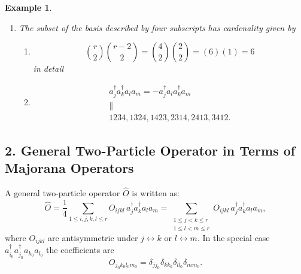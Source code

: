 \documentclass[aps,preprint]{revtex4}%
\newtheorem{example}[theorem]{Example}
\begin{document}
\begin{enumerate}
\begin{example}
\begin{enumerate}
\item The subset of the basis described by four subscripts has cardenality
given by

\begin{enumerate}
\item
\begin{equation}
\binom{r}{2}\binom{r-2}{2}=\binom{4}{2}\binom{2}{2}=\left(  6\right)  \left(
1\right)  =6
\end{equation}
in detail

\item
\begin{gather}
a_{j}^{\dagger}a_{k}^{\dagger}a_{l}a_{m}=-a_{j}^{\dagger}a_{l}a_{k}^{\dagger
}a_{m}\\
\parallel\\
1234,1324,1423,2314,2413,3412.
\end{gather}

\end{enumerate}
\end{enumerate}
\end{example}
\end{enumerate}

\subsection*{2. General Two-Particle Operator in Terms of Majorana Operators}

A general two-particle operator $\hat{O}$ is written as:
\[
\hat{O}=\frac{1}{4}\sum_{1\leq i,j,k,l\leq r}O_{ijkl}\,a_{j}^{\dagger}%
a_{k}^{\dagger}a_{l}a_{m}=\sum_{\substack{1\leq j<k\leq r\\1\leq l<m\leq
r}}O_{ijkl}\,a_{j}^{\dagger}a_{k}^{\dagger}a_{l}a_{m},
\]
where $O_{ijkl}$ are antisymmetric under $j\leftrightarrow k$ or
$l\leftrightarrow m$. In the special case $a_{i_{0}}^{\dagger}a_{j_{0}%
}^{\dagger}a_{k_{0}}a_{l_{0}}$ the coefficients are
\begin{equation}
O_{j_{0}k_{0}l_{0}m_{0}}=\delta_{jj_{0}}\delta_{kk_{0}}\delta_{ll_{0}}%
\delta_{mm_{0}}.
\end{equation}
\end{document}
